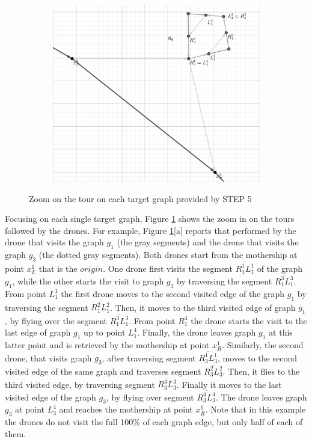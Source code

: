 \documentclass[10pt,a4paper]{elsarticle}
\newcommand{\EN}[1]{{\color{black}#1}}
\begin{document}
\begin{figure}[h!]
\begin{subfigure}[b]{0.4\textwidth}
		\caption{}%
	\end{subfigure}
	\begin{subfigure}[b]{0.4\textwidth}
		\includegraphics[width=\textwidth]{example_final-g4_gray.png}
		\caption{}
	\end{subfigure}%
	\caption{Zoom on the tour on each target graph provided by STEP 5}%
	\label{fig:example5}%
\end{figure}

\noindent 
Focusing on each single target graph, Figure \ref{fig:example5} shows the zoom \EN{in} on the tours followed by the drones. For example, Figure \ref{fig:example5}[a] reports th\EN{at} performed by the drone that visits the graph $g_1$ (the gray segments) and the drone that visits the graph $g_3$ (the dotted gray segments). Both drones start from the mothership at point $x^1_L$ that is the $origin$. One drone first visits the segment $\overline{R^1_1L^1_1}$ of the graph $g_1$, while the other starts the visit \EN{to} graph $g_3$ by traversing the segment $\overline{R^3_1L^3_1}$. From point $L^1_1$ the first drone moves to the second visited edge of the graph $g_1$ by traversing the segment $\overline{R^2_1L^2_1}$. Then, it moves to the third visited edge of graph $g_1$, by flying over the segment $\overline{R^3_1L^3_1}$. From point $R^4_1$ the drone starts the visit to the last edge of graph $g_1$ up to point $L^4_1$. 
Finally, the drone leaves graph $g_1$ at this latter point and is retrieved by the mothership at point $x^1_R$. Similarly, the second drone, that visits graph $g_3$, after traversing segment $\overline{R^1_3L^1_3}$, moves to the second visited edge of the same graph and traverses segment $\overline{R^2_3L^2_3}$. Then, it flies to the third visited edge, by traversing segment $\overline{R^3_3L^3_3}$. Finally it moves to the last visited edge of the graph $g_3$, by flying over segment $\overline{R^4_3L^4_3}$. The drone leaves graph $g_3$ at point $L^4_3$ and reaches the mothership at point $x_R^1$. 
Note that in this example the drones do not visit the full 100\% of each graph edge, but only half of each of them.
\end{document}
